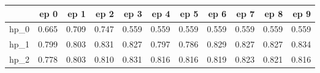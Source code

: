 \begin{tabular}{lrrrrrrrrrr}
\toprule
{} &   ep 0 &   ep 1 &   ep 2 &   ep 3 &   ep 4 &   ep 5 &   ep 6 &   ep 7 &   ep 8 &   ep 9 \\
\midrule
hp\_0 &  0.665 &  0.709 &  0.747 &  0.559 &  0.559 &  0.559 &  0.559 &  0.559 &  0.559 &  0.559 \\
hp\_1 &  0.799 &  0.803 &  0.831 &  0.827 &  0.797 &  0.786 &  0.829 &  0.827 &  0.827 &  0.834 \\
hp\_2 &  0.778 &  0.803 &  0.810 &  0.831 &  0.816 &  0.816 &  0.819 &  0.823 &  0.821 &  0.816 \\
\bottomrule
\end{tabular}
